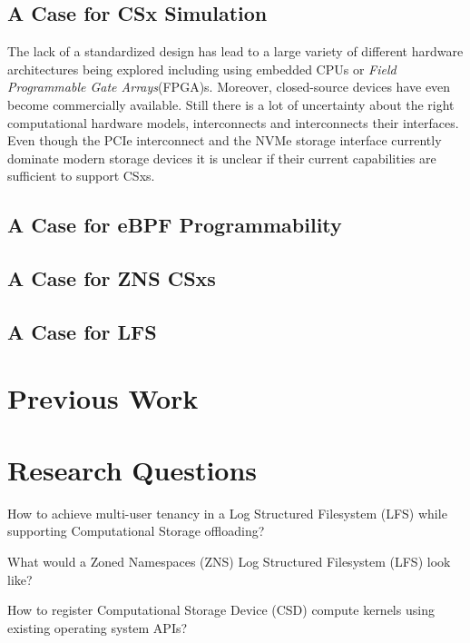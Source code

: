 \documentclass[conference]{IEEEtran}
\begin{document}
\subsection*{A Case for CSx Simulation}

The lack of a standardized design has lead to a large variety of different
hardware architectures being explored including using embedded CPUs or
\textit{Field Programmable Gate Arrays}(FPGA)s. Moreover, closed-source
devices have even become commercially available. Still there is a lot of
uncertainty about the right computational hardware models, interconnects and
interconnects their interfaces. Even though the PCIe interconnect and the NVMe
storage interface currently dominate modern storage devices it is unclear if
their current capabilities are sufficient to support CSxs.

\subsection*{A Case for eBPF Programmability}

\subsection*{A Case for ZNS CSxs}

\subsection*{A Case for LFS}

\section{Previous Work}



\section{Research Questions}

How to achieve multi-user tenancy in a Log Structured Filesystem (LFS) while
supporting Computational Storage offloading?

What would a Zoned Namespaces (ZNS) Log Structured Filesystem (LFS) look like?

How to register Computational Storage Device (CSD) compute kernels using
existing operating system APIs?
\end{document}

